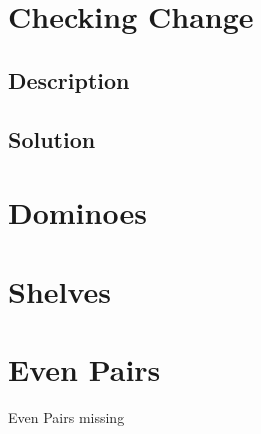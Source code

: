 \documentclass[a4paper, 10pt]{article}
\let\stdsection\section
\renewcommand\section{\newpage\stdsection}
\newcommand{\includecode}[1]{
    }
\begin{document}
    \setcounter{tocdepth}{1}
    \tableofcontents
    
    \section{Checking Change}
        \subsection{Description}
        \subsection{Solution}
        \label{sec:aliens}
        \includecode{../problems/w01/Checking_Change/CheckingChange1.cpp}
    
    \section{Dominoes}
        \label{sec:aliens}
        \includecode{../problems/w01/Dominoes/Dominoes1.cpp}
    
    \section{Shelves}
        \label{sec:aliens}
        \includecode{../problems/w01/Shelves/Shelves1.cpp}
        
    \section{Even Pairs}
        Even Pairs missing
    
\end{document}
